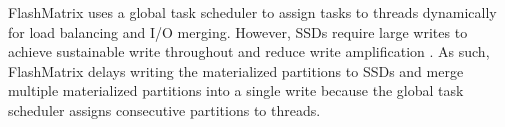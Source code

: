 FlashMatrix uses a global task scheduler to assign tasks to threads dynamically
for load balancing and I/O merging. However, SSDs require large
writes to achieve sustainable write throughout and reduce write amplification
\cite{}. As such, FlashMatrix delays writing the materialized partitions to
SSDs and merge multiple materialized partitions into a single write because
the global task scheduler assigns consecutive partitions to threads.





